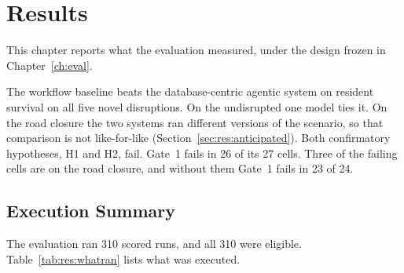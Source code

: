 \chapter{Results}
\label{ch:results}

%

This chapter reports what the evaluation measured, under the design frozen in
Chapter~\ref{ch:eval}.

The workflow baseline beats the database-centric agentic system on resident
survival on all five novel disruptions. On the undisrupted 
one model ties it. On the road closure the two systems ran different versions
of the scenario, so that comparison is not like-for-like
(Section~\ref{sec:res:anticipated}). Both confirmatory hypotheses, H1 and H2,
fail. Gate~1 fails in 26 of its 27 cells. Three of the failing cells are on
the road closure, and without them Gate~1 fails in 23 of 24.

\section{Execution Summary}
\label{sec:res:summary}

The evaluation ran 310 scored runs, and all 310 were eligible.
Table~\ref{tab:res:whatran} lists what was executed.

